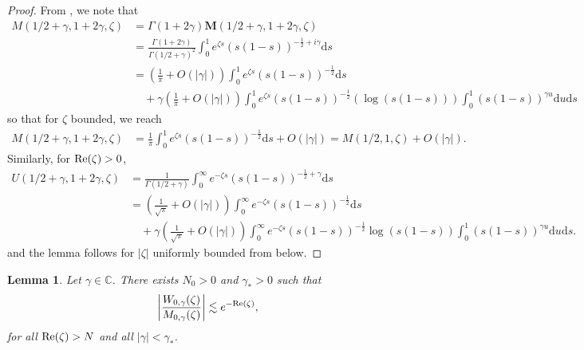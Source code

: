 \documentclass[11pt,reqno]{amsproc}
\newtheorem{lemma}[proposition]{Lemma}
\theoremstyle{definition}
\numberwithin{equation}{section}
\newcommand{\C}{{\mathbb C}}
\renewcommand{\d}{\mathrm{d}}
\def\Re{{\rm Re}}
\begin{document}
\begin{proof}
From \cite{NIST}, we note that 
\begin{align*}
M(1/2+\gamma,1+2\gamma,\zeta) &= \Gamma (1+2\gamma)\mathbf{M}(1/2+\gamma,1+2\gamma,\zeta) \\
&= \frac{\Gamma(1+2\gamma)}{\Gamma(1/2+\gamma)^2}\int_0^1 e^{\zeta s} \left( s(1-s) \right)^{-\frac12 + i \gamma} \d s \\
&= \left(\frac{1}{\pi} + O(|\gamma|) \right)\int_0^1 e^{\zeta s} \left( s(1-s) \right)^{-\frac12}\d s \\
&\quad +  \gamma\left(\frac{1}{\pi} + O(|\gamma|) \right)\int_0^1 e^{\zeta s} \left( s(1-s) \right)^{-\frac12}\left( \log(s(1-s)) \right)\int_0^1 (s(1-s))^{\gamma u} \d u \d s
\end{align*}
so that for $\zeta$ bounded, we reach
\begin{align*}
M(1/2+\gamma,1+2\gamma,\zeta) &= \frac{1}{\pi}\int_0^1 e^{\zeta s} \left( s(1-s) \right)^{-\frac12}\d s + O(|\gamma|) = M(1/2,1,\zeta) + O(|\gamma|).
\end{align*}
Similarly, for $\Re(\zeta)>0$, 
\begin{align*}
U(1/2+\gamma,1+2\gamma,\zeta) &= \frac{1}{\Gamma(1/2+\gamma)}\int_0^\infty e^{-\zeta s} (s(1-s))^{-\frac12+\gamma}\d s \\
&=\left( \frac{1}{\sqrt\pi} + O(|\gamma|) \right)\int_0^\infty e^{-\zeta s} (s(1-s))^{-\frac12}\d s \\
&\quad +\gamma \left( \frac{1}{\sqrt\pi} + O(|\gamma|) \right) \int_0^\infty e^{-\zeta s} (s(1-s))^{-\frac12} \log (s(1-s))\int_0^1 (s(1-s))^{\gamma u}\d u \d s.
\end{align*}
and the lemma follows for $|\zeta|$ uniformly bounded from below.
\end{proof}

\begin{lemma}\label{lemma:smallnulargearg}
Let $\gamma\in \C$. There exists $N_0>0$ and $\gamma_*>0$ such that 
\begin{align*}
\left| \frac{W_{0,\gamma}(\zeta)}{M_{0,\gamma}(\zeta)} \right| \lesssim e^{-\Re(\zeta)},
\end{align*}
for all $\Re(\zeta)>N$ and all $|\gamma|<\gamma_*$.
\end{lemma}
\end{document}
